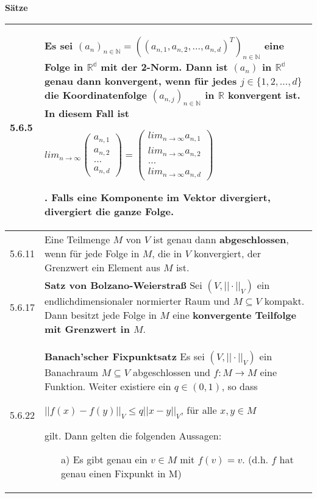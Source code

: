\noindent 
\textbf{Sätze}
\begin{table}[H]
\begin{tabularx}{\textwidth}{X m{16cm}}
    \toprule

    5.6.5 & Es sei $(a_n)_{n \in \mathbb{N}} = ((a_{n,1}, a_{n,2}, \dots, a_{n,d})^T)_{n \in \mathbb{N}}$ eine Folge in $\mathbb{R^d}$
            mit der 2-Norm. Dann ist $(a_n)$ in $\mathbb{R^d}$ genau dann \textbf{konvergent}, wenn für jedes $j \in \{1,2,\dots,d\}$ die
            Koordinatenfolge $(a_{n,j})_{n \in \mathbb{N}}$ in $\mathbb{R}$ \textbf{konvergent} ist. In diesem Fall ist \hfill \break
            \centerline{$lim_{n \rightarrow \infty}\begin{pmatrix}a_{n,1}\\a_{n,2}\\\dots \\ a_{n,d}\end{pmatrix} =
                \begin{pmatrix} lim_{n \rightarrow \infty} a_{n,1} \\ lim_{n \rightarrow \infty} a_{n,2} \\ \dots \\
                lim_{n \rightarrow \infty} a_{n,d} \end{pmatrix}$}.
            Falls eine Komponente im Vektor divergiert, divergiert die ganze Folge. \\
    \midrule
    5.6.11& Eine Teilmenge $M$ von $V$ ist genau dann \textbf{abgeschlossen}, wenn für jede Folge in $M$, die in $V$ konvergiert,
            der Grenzwert ein Element aus $M$ ist. \\
    \midrule
    5.6.17& \textbf{Satz von Bolzano-Weierstra\ss} \hfill \break
            Sei $(V, ||\cdot||_V)$ ein endlichdimensionaler normierter Raum und $M \subseteq V$ kompakt. Dann besitzt jede Folge in $M$
            eine \textbf{konvergente Teilfolge mit Grenzwert in $M$}. \\
    \midrule
    5.6.22& \textbf{Banach'scher Fixpunktsatz} \hfill \break
            Es sei $(V, ||\cdot||_V)$ ein Banachraum $M \subseteq V$ abgeschlossen und $f: M \rightarrow M$ eine Funktion.
            Weiter existiere ein $q \in (0,1)$, so dass \hfill \break
            \centerline{$||f(x) - f(y)||_V \leq q ||x-y||_V$, für alle $x,y \in M$}
            gilt. Dann gelten die folgenden Aussagen:
            \begin{itemize}
                \item[a)] Es gibt genau ein $v \in M$ mit $f(v) = v$. (d.h. $f$ hat genau einen Fixpunkt in M)

\end{itemize}
\end{tabularx}
\end{table}
